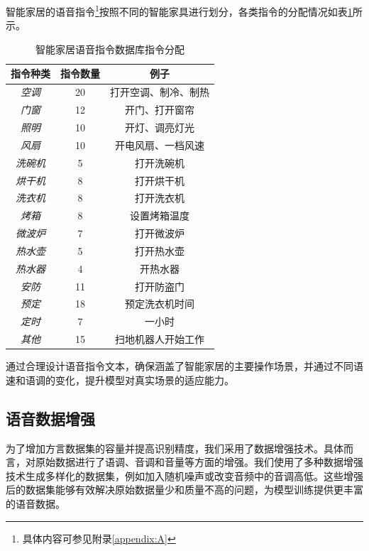 \documentclass[lang=cn,cite=super]{elegantpaper}
\begin{document}
智能家居的语音指令\footnote{具体内容可参见附录\ref{appendix:A}}按照不同的智能家具进行划分，各类指令的分配情况如表\ref{tab:1}所示。

\begin{table}[h]
    \caption{\label{tab:1} 智能家居语音指令数据库指令分配}
    \begin{center}
        \begin{tabular}{ccc}
            \toprule
            \textbf{指令种类} & \textbf{指令数量} & \textbf{例子} \\
            \midrule
            \textit{空调} & 20 & 打开空调、制冷、制热 \\
            \textit{门窗} & 12 & 开门、打开窗帘 \\
            \textit{照明} & 10 & 开灯、调亮灯光 \\
            \textit{风扇} & 10 & 开电风扇、一档风速 \\
            \textit{洗碗机} & 5 & 打开洗碗机 \\
            \textit{烘干机} & 8 & 打开烘干机 \\
            \textit{洗衣机} & 8 & 打开洗衣机 \\
            \textit{烤箱} & 8 & 设置烤箱温度 \\
            \textit{微波炉} & 7 & 打开微波炉\\
            \textit{热水壶} & 5 & 打开热水壶 \\
            \textit{热水器} & 4 & 开热水器 \\
            \textit{安防} & 11 & 打开防盗门 \\
            \textit{预定} & 18 & 预定洗衣机时间 \\
            \textit{定时} & 7 & 一小时 \\
            \textit{其他} & 15 & 扫地机器人开始工作 \\
            \bottomrule
        \end{tabular}
    \end{center}
\end{table}

通过合理设计语音指令文本，确保涵盖了智能家居的主要操作场景，并通过不同语速和语调的变化，提升模型对真实场景的适应能力。

\subsection{语音数据增强}

为了增加方言数据集的容量并提高识别精度，我们采用了数据增强技术。具体而言，对原始数据进行了语调、音调和音量等方面的增强。我们使用了多种数据增强技术生成多样化的数据集，例如加入随机噪声或改变音频中的音调高低。这些增强后的数据集能够有效解决原始数据量少和质量不高的问题，为模型训练提供更丰富的语音数据。
\end{document}
